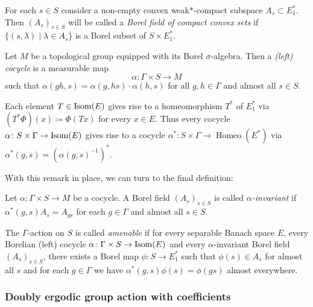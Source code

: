 \begin{defin}
  For each \(s \in S\) consider a non-empty convex weak\(\ast\)-compact subspace \(A_s \subset E^\ast_1\). Then \((A_s)_{s \in S}\) will be called a \emph{Borel field of compact convex sets} if \(\{(s, \lambda) \mid \lambda \in A_s\}\) is a Borel subset of \(S \times E^\ast_1\).  
\end{defin}

\begin{defin}
  Let \(M\) be a topological group equipped with its Borel \(\sigma\)-algebra. Then a \emph{(left) cocycle} is a measurable map
  \[
    \alpha \colon \Gamma \times S \to M
  \]
  such that \(\alpha(gh, s) = \alpha(g, hs)\cdot \alpha(h, s)\) for all \(g, h \in \Gamma\) and almost all \(s \in S\).
\end{defin}

\begin{rem}
  Each element \(T \in \operatorname{Isom}(E)\) gives rise to a homeomorphism \(T^\ast\) of \(E^\ast_1\) via \((T^\ast\Phi)(x) \coloneqq \Phi(Tx)\) for every \(x \in E\). Thus every cocycle \(\alpha \colon S \times \Gamma \to \operatorname{Isom}(E)\) gives rise to a cocycle \(\alpha^\ast \colon S \times \Gamma \to \operatorname{Homeo}(E^\ast)\) via \(\alpha^\ast (g, s) = (\alpha(g, s)^{-1})^\ast\).
\end{rem}

With this remark in place, we can turn to the final definition:

\begin{defin}
  Let \(\alpha\colon \Gamma \times S \to M\) be a cocycle. A Borel field \((A_s)_{s \in S}\) is called \emph{\(\alpha\)-invariant} if \(\alpha^\ast(g, s) A_{s} = A_{gs}\) for each \(g \in \Gamma\) and almost all \(s \in S\).

  The \(\Gamma\)-action on \(S\) is called \emph{amenable} if for every separable Banach space \(E\), every Borelian (left) cocycle \(\alpha \colon \Gamma \times S \to \operatorname{Isom}(E)\) and every \(\alpha\)-invariant Borel field \((A_s)_{s \in S}\), there exists a Borel map \(\phi \colon S \to E^\ast_1\) such that \(\phi(s) \in A_s\) for almost all \(s\) and for each \(g \in \Gamma\) we have \(\alpha^\ast(g, s) \phi(s) = \phi(gs)\) almost everywhere.
\end{defin}

\subsubsection*{Doubly ergodic group action with coefficients}
\label{sec:ergodic-with-coeff}


